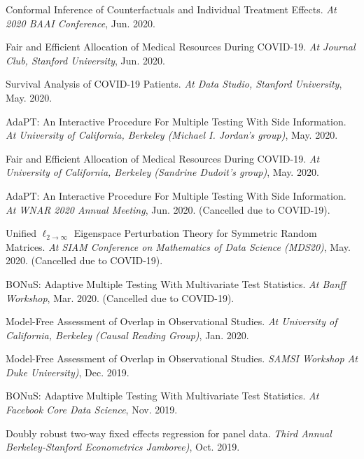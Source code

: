 \documentclass{article}
\begin{document}
\vspace{2mm}
Conformal Inference of Counterfactuals and Individual Treatment Effects. \emph{At 2020 BAAI Conference}, Jun. 2020. 

\vspace{2mm}
Fair and Efficient Allocation of Medical Resources During COVID-19. \emph{At Journal Club, Stanford University}, Jun. 2020.

\vspace{2mm}
Survival Analysis of COVID-19 Patients. \emph{At Data Studio, Stanford University}, May. 2020.

\vspace{2mm}
AdaPT: An Interactive Procedure For Multiple Testing With Side Information. \emph{At University of California, Berkeley (Michael I. Jordan's group)}, May. 2020. 

\vspace{2mm}
Fair and Efficient Allocation of Medical Resources During COVID-19. \emph{At University of California, Berkeley (Sandrine Dudoit's group)}, May. 2020. 

\vspace{2mm}
AdaPT: An Interactive Procedure For Multiple Testing With Side Information. \emph{At WNAR 2020 Annual Meeting}, Jun. 2020. (Cancelled due to COVID-19).

\vspace{2mm}
Unified $\ell_{2\rightarrow\infty}$ Eigenspace Perturbation Theory for Symmetric Random Matrices. \emph{At SIAM Conference on Mathematics of Data Science (MDS20)}, May. 2020. (Cancelled due to COVID-19).

\vspace{2mm}
BONuS: Adaptive Multiple Testing With Multivariate Test Statistics. \emph{At Banff Workshop}, Mar. 2020. (Cancelled due to COVID-19).

\vspace{2mm}
Model-Free Assessment of Overlap in Observational Studies. \emph{At University of California, Berkeley (Causal Reading Group)}, Jan. 2020.

\vspace{2mm}
Model-Free Assessment of Overlap in Observational Studies. \emph{SAMSI Workshop At Duke University)}, Dec. 2019.

\vspace{2mm}
BONuS: Adaptive Multiple Testing With Multivariate Test Statistics. \emph{At Facebook Core Data Science}, Nov. 2019.

\vspace{2mm}
Doubly robust two-way fixed effects regression for panel data. \emph{Third Annual Berkeley-Stanford Econometrics Jamboree)}, Oct. 2019.
\end{document}
